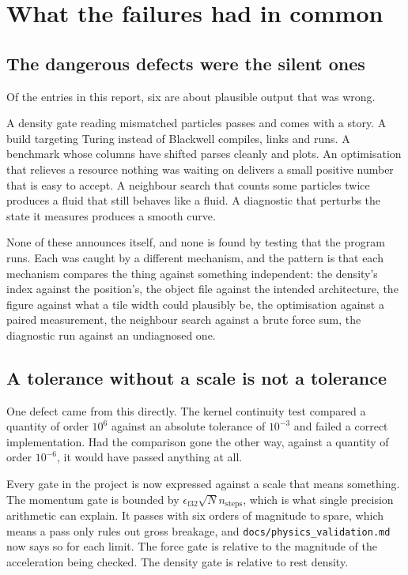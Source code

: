 \chapter{What the failures had in common}

\section{The dangerous defects were the silent ones}

Of the \DebugEntryCount{} entries in this report, six are about plausible output that was
wrong.

A density gate reading mismatched particles passes and comes with a story. A build targeting Turing instead of Blackwell compiles, links and runs. A
benchmark whose columns have shifted parses cleanly and plots. An optimisation
that relieves a resource nothing was waiting on delivers a small positive
number that is easy to accept. A neighbour search that counts some particles
twice produces a fluid that still behaves like a fluid. A diagnostic that
perturbs the state it measures produces a smooth curve.

None of these announces itself, and none is found by testing that the program
runs. Each was caught by a different mechanism, and the pattern is that each
mechanism compares the thing against something independent: the density's index against the
position's, the object file against the intended architecture, the figure against what a tile width could
plausibly be, the optimisation against a paired measurement, the neighbour search against a brute force sum, the diagnostic run
against an undiagnosed one.

\section{A tolerance without a scale is not a tolerance}

One defect came from this directly. The kernel continuity test compared a
quantity of order $10^6$ against an absolute tolerance of $10^{-3}$ and failed a
correct implementation. Had the comparison gone the other way, against a
quantity of order $10^{-6}$, it would have passed anything at all.

Every gate in the project is now expressed against a scale that means
something. The momentum gate is bounded by $\epsilon_{\mathrm{f32}} \sqrt{N}
n_{\mathrm{steps}}$, which is what single precision arithmetic can explain. It passes with six
orders of magnitude to spare, which means a pass only rules out gross breakage, and
\texttt{docs/physics\_validation.md} now says so for each limit. The force gate is relative to the
magnitude of the acceleration being checked. The density gate is relative to
rest density.


